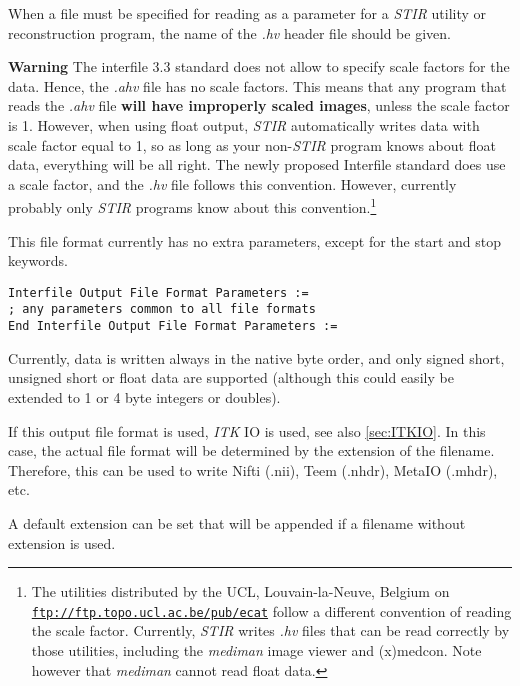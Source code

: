 \documentclass{article}
\def\R2Lurl#1#2{\mbox{\href{#1}{\tt #2}}}
\begin{document}
When a file must be specified for reading as a parameter for 
a \textit{STIR} utility or reconstruction program, the name of the \textit{.hv} 
header file should be given. 



\textbf{Warning} The interfile 3.3 standard does not allow to specify 
scale factors for the data. Hence, the \textit{.ahv} file has no scale 
factors. This means that any program that reads the \textit{.ahv} 
file \textbf{will have improperly scaled images}, unless the scale 
factor is 1. However, when using float output, \textit{STIR} automatically 
writes data with scale factor equal to 1, so as long as your 
non-\textit{STIR} program knows about float data, everything will 
be all right. The newly proposed Interfile standard does use 
a scale factor, and the \textit{.hv} file follows this convention. 
However, currently probably only \textit{STIR} programs know about 
this convention.\footnote{{\small The utilities distributed by the UCL, 
Louvain-la-Neuve, Belgium on \R2Lurl{ftp://ftp.topo.ucl.ac.be/pub/ecat }{ftp://ftp.topo.ucl.ac.be/pub/ecat} 
follow a different convention of reading the scale factor. Currently, \textit{STIR} 
writes \textit{.hv} files that can be read correctly by those utilities, 
including the \textit{mediman} image viewer and (x)medcon. Note however 
that \textit{mediman} cannot read float data.}}

{ 
}

This file format currently has no extra parameters, except for 
the start and stop keywords.

\begin{verbatim}
Interfile Output File Format Parameters :=
; any parameters common to all file formats
End Interfile Output File Format Parameters :=
\end{verbatim}

Currently, data is written always in the native byte order, and 
only signed short, unsigned short or float data are supported 
(although this could easily be extended to 1 or 4 byte integers 
or doubles).

{ 
}
If this output file format is used, \textit{ITK} IO is used, see also \ref{sec:ITKIO}. 
In this case, the actual file format will be determined by the extension of the filename.
Therefore, this can be used to write Nifti (.nii), Teem (.nhdr),
MetaIO (.mhdr), etc.

A default extension can be set that will be  appended if a filename without extension is used.
\end{document}
